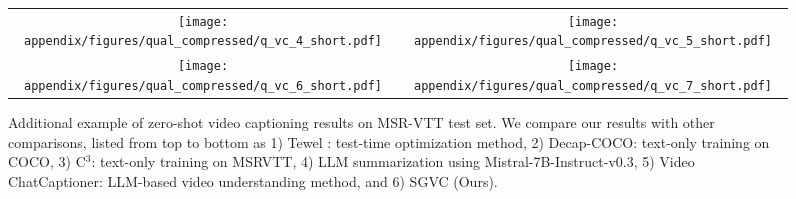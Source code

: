 
\begin{figure*}[t!]
    \centering
        \begin{tabular}{@{}cc@{}}
                \texttt{[image: appendix/figures/qual\_compressed/q\_vc\_4\_short.pdf]} & 
                \hspace{1em}
                \texttt{[image: appendix/figures/qual\_compressed/q\_vc\_5\_short.pdf]} \\
                \texttt{[image: appendix/figures/qual\_compressed/q\_vc\_6\_short.pdf]} &
                \hspace{1em}
                \texttt{[image: appendix/figures/qual\_compressed/q\_vc\_7\_short.pdf]} \\
        \end{tabular}
    \vspace{-2mm}
    \caption{Additional example of zero-shot video captioning results on MSR-VTT test set. We compare our results with other comparisons, listed from top to bottom as 1) Tewel \etal: test-time optimization method, 2) Decap-COCO: text-only training on COCO, 3) C$^{3}$: text-only training on MSRVTT, 4) LLM summarization using Mistral-7B-Instruct-v0.3, 5) Video ChatCaptioner: LLM-based video understanding method, and 6) SGVC (Ours).}
    \label{fig:qual_vc_supple}
\end{figure*}
